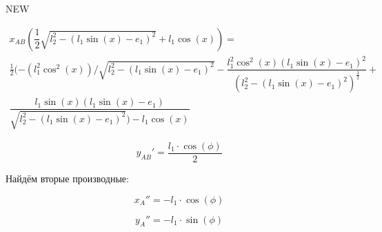 NEW

\begin{multline}
x_{AB}(\dfrac{1}{2} \sqrt{l_{2}^{2} - (l_1\sin(x) - e_1)^2} + l_1 \cos(x)) =\\ \frac{1}{2} (-(l_1^2 \cos^2(x))/\sqrt{l_2^2 - (l_1 \sin(x) - e_1)^2} - \dfrac{l_1^2 \cos^2(x) (l_1 \sin(x) - e_1)^2}{(l_2^2 - (l_1 \sin(x) - e_1)^2)^{\frac{3}{2}}} +\\ \dfrac{l_1 \sin(x) (l_1 \sin(x) - e_1)}{\sqrt{l_2^2 - (l_1 \sin(x) - e_1)^2}) - l_1 \cos(x)}
\end{multline}

\begin{figure}[H]
	\centering
\end{figure}
\newpage
\begin{equation}\label{eq:yABdphi}
	y_{AB}'=\dfrac{l_1\cdot\cos(\phi)}{2}
\end{equation}

\begin{figure}[H]
	\centering
\end{figure}
\newpage
Найдём вторые производные:

\begin{equation}\label{eq:xAdphi2}
	x_A''=-l_1\cdot\cos(\phi)
\end{equation}

\begin{figure}[H]
	\centering
\end{figure}
\newpage
\begin{equation}\label{eq:yAdphi2}
	y_A''=-l_1\cdot\sin(\phi)
\end{equation}

